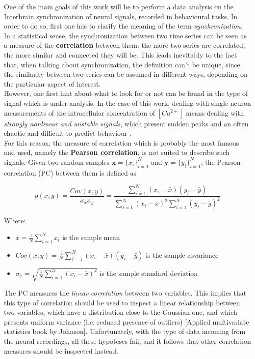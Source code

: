 \documentclass[a4paper]{article}
\begin{document}
One of the main goals of this work will be to perform a data analysis on the Interbrain synchronization of neural signals, recorded in behavioural tasks. In order to do so, first one has to clarify the meaning of the term  \textit{synchronization}.\\
 In a statistical sense, the synchronization between two time series can be seen as a measure of the \textbf{correlation} between them: the more two series are correlated, the more similar and connected they will be. This leads inevitably to the fact that, when talking about synchronization, the definition can't be unique, since the similarity between two series can be assumed in different ways, depending on the particular aspect of interest. \\
However, one first hint about what to look for or not can be found in the type of signal which is under analysis. In the case of this work, dealing with single neuron measurements of the intracellular concentration of $[Ca^{2+}]$ means dealing with \textit{strongly nonlinear and unstable signals}, which present sudden peaks and an often chaotic and difficult to predict behaviour .\\
For this reason, the measure of correlation which is probably the most famous and used, namely the \textbf{Pearson correlation}, is not suited to describe such signals. Given two random samples $ \textbf{x} = \{x_i\}_{i=1}^N$ and  $ \textbf{y} = \{y_i\}_{i=1}^N$, the Pearson correlation (PC) between them is defined as

$$ \rho(x,y) = \frac{Cov(x,y)}{\sigma_x \sigma_y} = \frac{\sum_{i=1}^{N}(x_i-\bar{x}) (y_i-\bar{y})} {\sum_{i=1}^{N}(x_i-\bar{x})^2 \sum_{i=1}^{N} (y_i-\bar{y})^2} $$

Where:
\begin{itemize}
	\item $ \bar{x} = \frac{1}{N}\sum_{i=1}^{N}x_i$ is the sample mean
	
	\item $Cov(x,y) = \frac{1}{N}\sum_{i=1}^{N}(x_i-\bar{x}) (y_i-\bar{y})$ is the sample covariance
	
	\item $\sigma_x = \sqrt{\frac{1}{N}\sum_{i=1}^{N}(x_i-\bar{x})^2}$ is the sample standard deviation
\end{itemize}

The PC measures the \textit{linear correlation} between two variables. This implies that this type of correlation should be used to inspect a linear relationship between two variables, which have a distribution close to the Gaussian one, and which presents uniform variance (i.e. reduced presence of outliers) [Applied multivariate statistics book by Johnson]. Unfortunately, with the type of data incoming from the neural recordings, all these hypoteses fail, and it follows that other correlation measures should be inspected instead.
\end{document}
